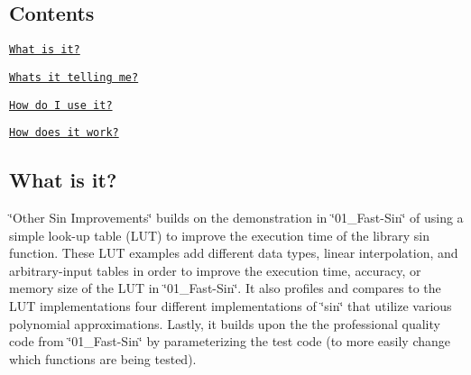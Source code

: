 \subsection*{Contents}


\begin{DoxyEnumerate}
\item \href{https://github.com/nathancharlesjones/Look-up-Table-Examples/blob/master/02_Other-Sin-Improvements/README.md#what-is-it}{\tt What is it?}
\item \href{https://github.com/nathancharlesjones/Look-up-Table-Examples/blob/master/02_Other-Sin-Improvements/README.md#whats-it-telling-me}{\tt What\textquotesingle{}s it telling me?}
\item \href{https://github.com/nathancharlesjones/Look-up-Table-Examples/blob/master/02_Other-Sin-Improvements/README.md#how-do-i-use-it}{\tt How do I use it?}
\item \href{https://github.com/nathancharlesjones/Look-up-Table-Examples/blob/master/02_Other-Sin-Improvements/README.md#how-does-it-work}{\tt How does it work?}
\end{DoxyEnumerate}

\subsection*{What is it?}

\char`\"{}\+Other Sin Improvements\char`\"{} builds on the demonstration in \char`\"{}01\+\_\+\+Fast-\/\+Sin\char`\"{} of using a simple look-\/up table (L\+UT) to improve the execution time of the library sin function. These L\+UT examples add different data types, linear interpolation, and arbitrary-\/input tables in order to improve the execution time, accuracy, or memory size of the L\+UT in \char`\"{}01\+\_\+\+Fast-\/\+Sin\char`\"{}. It also profiles and compares to the L\+UT implementations four different implementations of \char`\"{}sin\char`\"{} that utilize various polynomial approximations. Lastly, it builds upon the the professional quality code from \char`\"{}01\+\_\+\+Fast-\/\+Sin\char`\"{} by parameterizing the test code (to more easily change which functions are being tested).

